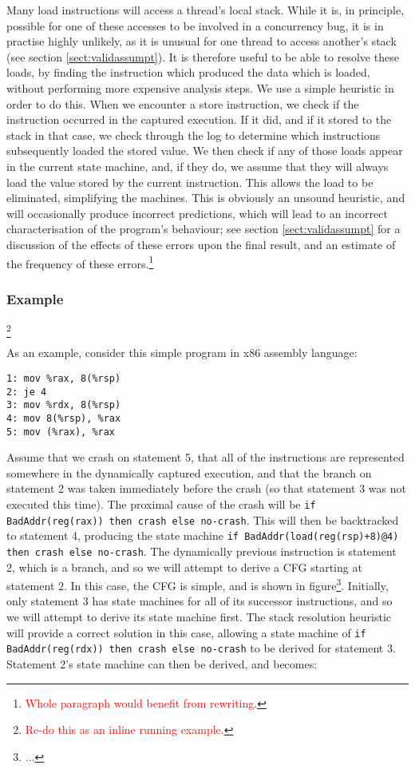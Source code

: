 \documentclass[10pt,twocolumn,preprint,natbib,authoryear]{sigplanconf}
\newcommand{\editorial}[1]{\textcolor{red}{\footnote{\textcolor{red}{#1}}}}
\begin{document}
Many load instructions will access a thread's local stack.  While it
is, in principle, possible for one of these accesses to be involved in
a concurrency bug, it is in practise highly unlikely, as it is unusual
for one thread to access another's stack (see section
\ref{sect:validassumpt}).  It is therefore useful to be able to
resolve these loads, by finding the instruction which produced the
data which is loaded, without performing more expensive analysis
steps.  We use a simple heuristic in order to do this.  When we
encounter a store instruction, we check if the instruction occurred in
the captured execution.  If it did, and if it stored to the stack in
that case, we check through the log to determine which instructions
subsequently loaded the stored value.  We then check if any of those
loads appear in the current state machine, and, if they do, we assume
that they will always load the value stored by the current
instruction.  This allows the load to be eliminated, simplifying the
machines.  This is obviously an unsound heuristic, and will
occasionally produce incorrect predictions, which will lead to an
incorrect characterisation of the program's behaviour; see section
\ref{sect:validassumpt} for a discussion of the effects of these
errors upon the final result, and an estimate of the frequency of
these errors.\editorial{Whole paragraph would benefit from rewriting.}

\subsubsection{Example}\editorial{Re-do this as an inline running example.}

As an example, consider this simple program in x86 assembly language:

\begin{verbatim}
1: mov %rax, 8(%rsp)
2: je 4
3: mov %rdx, 8(%rsp)
4: mov 8(%rsp), %rax
5: mov (%rax), %rax
\end{verbatim}

Assume that we crash on statement 5, that all of the instructions are
represented somewhere in the dynamically captured execution, and that
the branch on statement 2 was taken immediately before the crash (so
that statement 3 was not executed this time).  The proximal cause of
the crash will be
\verb|if BadAddr(reg(rax)) then crash else no-crash|.  This will then
be backtracked to statement 4, producing the state machine
\verb|if BadAddr(load(reg(rsp)+8)@4) then crash else no-crash|.  The
dynamically previous instruction is statement 2, which is a branch,
and so we will attempt to derive a CFG starting at statement 2.  In
this case, the CFG is simple, and is shown in figure\editorial{...}.
Initially, only statement 3 has state machines for all of its
successor instructions, and so we will attempt to derive its state
machine first.  The stack resolution heuristic will provide a correct
solution in this case, allowing a state machine of
\verb|if BadAddr(reg(rdx)) then crash else no-crash| to be derived for
statement 3.  Statement 2's state machine can then be derived, and
becomes:
\end{document}
